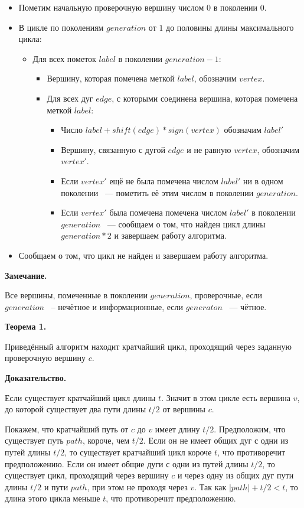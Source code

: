 \documentclass[14pt]{mmcs-article}
\begin{document}
\begin{itemize}
\item Пометим начальную проверочную вершину числом $0$ в поколении $0$.
\item В цикле по поколениям $generation$ от $1$ до половины длины максимального цикла:
  \begin{itemize}
  \item Для всех пометок $label$ в поколении $generation - 1$:
    \begin{itemize}
    \item Вершину, которая помечена меткой $label$, обозначим $vertex$.
    \item Для всех дуг $edge$, с которыми соединена вершина, которая помечена меткой $label$:
      \begin{itemize}
      \item Число $label + shift(edge) * sign(vertex)$ обозначим $label'$
      \item Вершину, связанную с дугой $edge$ и не равную $vertex$, обозначим $vertex'$.
      \item Если $vertex'$ ещё не была помечена числом $label'$ ни в одном поколении ~--- пометить её этим числом в поколении $generation$.
      \item Если $vertex'$ была помечена помечена числом  $label'$ в поколении $generation$ ~--- сообщаем о том, что найден цикл длины $generation * 2$ и завершаем работу алгоритма.
      \end{itemize}
    \end{itemize}
  \end{itemize}
  \item Сообщаем о том, что цикл не найден и завершаем работу алгоритма.
\end{itemize}

\textbf{Замечание.}

Все вершины, помеченные в поколении $generation$, проверочные, если $generation$ ~-- нечётное и информационные, если $generaton$ ~--- чётное.

\textbf{Теорема 1.}

Приведённый алгоритм находит кратчайший цикл, проходящий через заданную проверочную вершину $c$.

\textbf{Доказательство.}

Если существует кратчайший цикл длины $t$. Значит в этом цикле есть вершина $v$, до которой существует два пути длины $t / 2$ от вершины $c$. 

Покажем, что кратчайший путь от $c$ до $v$ имеет длину $t / 2$.  Предположим, что существует путь $path$, короче, чем $t / 2$. Если он не имеет общих дуг с одни из путей длины $t / 2$, то существует кратчайший цикл короче $t$, что противоречит предположению. Если он имеет общие дуги с одни из путей длины $t / 2$, то существует цикл, проходящий через вершину $c$ и через одну из общих дуг пути длины $t / 2$ и пути $path$, при этом не проходя через $v$. Так как $|path| + t / 2 < t$, то длина этого цикла меньше $t$, что противоречит предположению.
\end{document}
